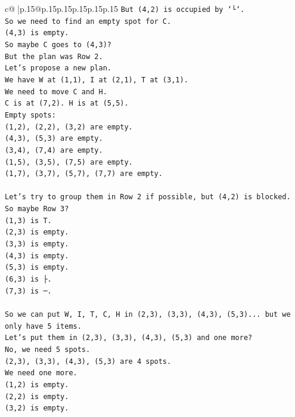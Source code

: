 \documentclass{article}
\begin{document}
{\begin{supertabular}{c@{$\;$}|p{.15\linewidth}@{}p{.15\linewidth}p{.15\linewidth}p{.15\linewidth}p{.15\linewidth}p{.15\linewidth}}
{{{\texttt{But (4,2) is occupied by `└`.} \\
\texttt{So we need to find an empty spot for C.} \\
\texttt{(4,3) is empty.} \\
\texttt{So maybe C goes to (4,3)?} \\
\texttt{But the plan was Row 2.} \\
\texttt{Let's propose a new plan.} \\
\texttt{We have W at (1,1), I at (2,1), T at (3,1).} \\
\texttt{We need to move C and H.} \\
\texttt{C is at (7,2). H is at (5,5).} \\
\texttt{Empty spots:} \\
\texttt{(1,2), (2,2), (3,2) are empty.} \\
\texttt{(4,3), (5,3) are empty.} \\
\texttt{(3,4), (7,4) are empty.} \\
\texttt{(1,5), (3,5), (7,5) are empty.} \\
\texttt{(1,7), (3,7), (5,7), (7,7) are empty.} \\
\\ 
\texttt{Let's try to group them in Row 2 if possible, but (4,2) is blocked.} \\
\texttt{So maybe Row 3?} \\
\texttt{(1,3) is T.} \\
\texttt{(2,3) is empty.} \\
\texttt{(3,3) is empty.} \\
\texttt{(4,3) is empty.} \\
\texttt{(5,3) is empty.} \\
\texttt{(6,3) is ├.} \\
\texttt{(7,3) is ─.} \\
\\ 
\texttt{So we can put W, I, T, C, H in (2,3), (3,3), (4,3), (5,3)... but we only have 5 items.} \\
\texttt{Let's put them in (2,3), (3,3), (4,3), (5,3) and one more?} \\
\texttt{No, we need 5 spots.} \\
\texttt{(2,3), (3,3), (4,3), (5,3) are 4 spots.} \\
\texttt{We need one more.} \\
\texttt{(1,2) is empty.} \\
\texttt{(2,2) is empty.} \\
\texttt{(3,2) is empty.} \\
}}}
\end{supertabular}}
\end{document}
